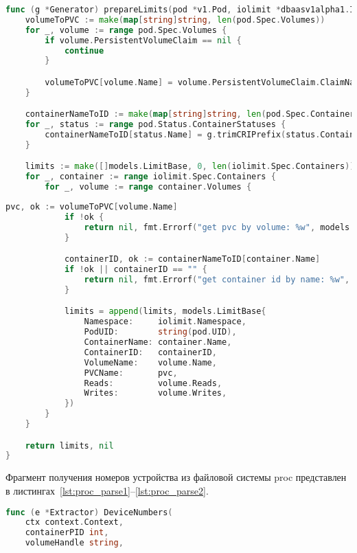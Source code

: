 \begin{lstlisting}[language=Go,label=lst:container_id1, caption={Получение идентификатора контейнера}]
func (g *Generator) prepareLimits(pod *v1.Pod, iolimit *dbaasv1alpha1.IOLimit) ([]models.LimitBase, error) {
	volumeToPVC := make(map[string]string, len(pod.Spec.Volumes))
	for _, volume := range pod.Spec.Volumes {
		if volume.PersistentVolumeClaim == nil {
			continue
		}

		volumeToPVC[volume.Name] = volume.PersistentVolumeClaim.ClaimName
	}

	containerNameToID := make(map[string]string, len(pod.Spec.Containers))
	for _, status := range pod.Status.ContainerStatuses {
		containerNameToID[status.Name] = g.trimCRIPrefix(status.ContainerID)
	}

	limits := make([]models.LimitBase, 0, len(iolimit.Spec.Containers))
	for _, container := range iolimit.Spec.Containers {
		for _, volume := range container.Volumes {
\end{lstlisting}

\begin{lstlisting}[language=Go,label=lst:container_id2, caption={Получение идентификатора контейнера (продолжение листинга~\ref{lst:container_id1})}]
			pvc, ok := volumeToPVC[volume.Name]
			if !ok {
				return nil, fmt.Errorf("get pvc by volume: %w", models.ErrPVCNotFound)
			}

			containerID, ok := containerNameToID[container.Name]
			if !ok || containerID == "" {
				return nil, fmt.Errorf("get container id by name: %w", models.ErrContainerNotFound)
			}

			limits = append(limits, models.LimitBase{
				Namespace:     iolimit.Namespace,
				PodUID:        string(pod.UID),
				ContainerName: container.Name,
				ContainerID:   containerID,
				VolumeName:    volume.Name,
				PVCName:       pvc,
				Reads:         volume.Reads,
				Writes:        volume.Writes,
			})
		}
	}

	return limits, nil
}
\end{lstlisting}


Фрагмент получения номеров устройства из файловой системы proc представлен в листингах~\ref{lst:proc_parse1}--\ref{lst:proc_parse2}.

\begin{lstlisting}[language=Go,label=lst:proc_parse1, caption={Получение номеров устройства}]
func (e *Extractor) DeviceNumbers(
    ctx context.Context, 
    containerPID int, 
    volumeHandle string,
\end{lstlisting}

